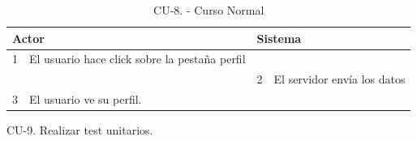 \begin{itemize}
\begin{itemize}
\begin{table}[H]
\begin{tabularx}{\textwidth}{|l|X|l|X|}
        \multicolumn{2}{|l|}{\cellcolor[HTML]{EFEFEF}Actor} & \multicolumn{2}{l|}{\cellcolor[HTML]{EFEFEF}Sistema} \\ \hline
        1                         & El usuario hace click sobre la pestaña perfil                     &                            &                         \\ \hline
                                  &                         & 2                          & El servidor envía los datos                     \\ \hline
        3                         & El usuario ve su perfil.      &                          &                        \\ \hline
                                  
      \end{tabularx}
      \caption{CU-8. - Curso Normal}
      \label{my-label}
    \end{table}
  \end{itemize}
  \end{itemize}
  \item CU-9. Realizar test unitarios.
